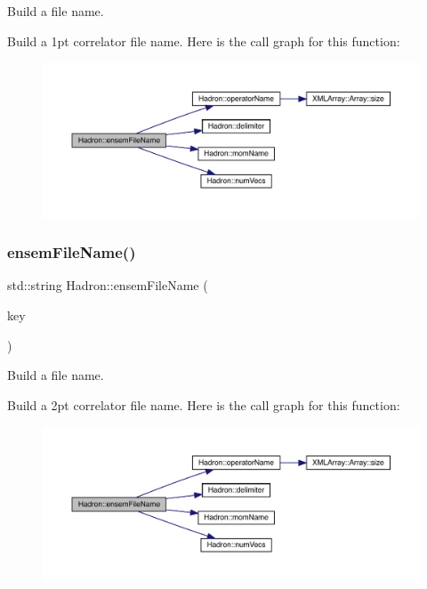 Build a file name. 

Build a 1pt correlator file name. Here is the call graph for this function\+:\nopagebreak
\begin{figure}[H]
\begin{center}
\leavevmode
\includegraphics[width=350pt]{d1/daf/namespaceHadron_af97a705730e771598736c0ddcec48fea_cgraph}
\end{center}
\end{figure}
\mbox{\label{namespaceHadron_a031dddf6856dd71ac8114cf9c4106268}} 
\subsubsection{\texorpdfstring{ensemFileName()}{ensemFileName()}\hspace{0.1cm}{\footnotesize\ttfamily [3/12]}}
{\footnotesize\ttfamily std\+::string Hadron\+::ensem\+File\+Name (\begin{DoxyParamCaption}\item[{const \mbox{\hyperlink{structFF_1_1KeyHadron2PtCorr__t}{F\+F\+::\+Key\+Hadron2\+Pt\+Corr\+\_\+t}} \&}]{key }\end{DoxyParamCaption})}



Build a file name. 

Build a 2pt correlator file name. Here is the call graph for this function\+:\nopagebreak
\begin{figure}[H]
\begin{center}
\leavevmode
\includegraphics[width=350pt]{d1/daf/namespaceHadron_a031dddf6856dd71ac8114cf9c4106268_cgraph}
\end{center}
\end{figure}
\mbox{\label{namespaceHadron_a1043f4c7b4a30f750e2484e69ff0a25b}} 
